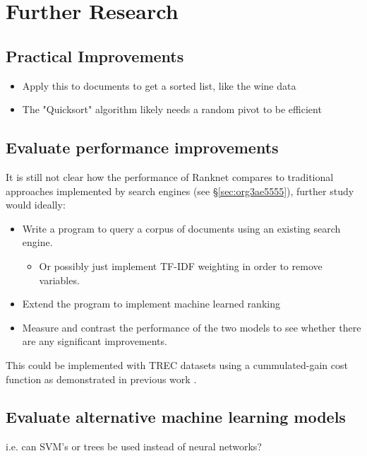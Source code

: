 \documentclass[a4paper,11pt,twoside]{article}
\begin{document}
\section{Further Research}
\label{sec:orgfaa6dce}


\subsection{Practical Improvements}
\label{sec:org4069b77}

\begin{itemize}
\item Apply this to documents to get a sorted list, like the wine data
\item The "Quicksort" algorithm likely needs a random pivot to be efficient \cite{timroughgardenQuicksortOverview2017}
\end{itemize}

\subsection{Evaluate performance improvements}
\label{sec:org796abc6}

It is still not clear how the
performance of Ranknet compares to traditional approaches
implemented by search engines (see \S \ref{sec:org3ae5555}), further
study would ideally:

\begin{itemize}
\item Write a program to query a corpus of documents using an existing search engine.
\begin{itemize}
\item Or possibly just implement TF-IDF weighting in order to remove variables.
\end{itemize}
\item Extend the program to implement machine learned ranking
\item Measure and contrast the performance of the two models to see
whether there are any significant improvements.
\end{itemize}

This could be implemented with TREC datasets
\cite{usnationalinstituteofstandardsandtechnologyTextREtrievalConference}
using a cummulated-gain cost function
\cite{jarvelinCumulatedGainbasedEvaluation2002} as demonstrated in
previous work \cite{viksinghComparisonOpenSource2009}.

\subsection{Evaluate alternative machine learning models}
\label{sec:org08b68c7}
i.e. can SVM's or trees be used instead of neural networks?
\end{document}
